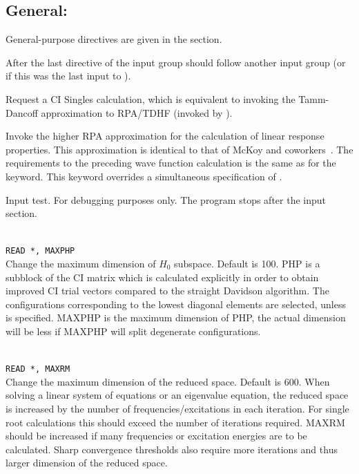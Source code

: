 \subsection{General: }

General-purpose directives are given in the  section.

After the last directive of the  input group
should follow another {} input group
(or  if this was the last input to \dalton).

\begin{description}

\item{}
Request a CI Singles calculation, which is equivalent to invoking the
Tamm-Dancoff approximation to RPA/TDHF (invoked by ).

\item{}
Invoke the higher RPA approximation for the calculation of linear
response properties.
This approximation is identical to that of McKoy
and coworkers~\cite{jrtsvmjcp58,tsjrvmjcp58}. The requirements to the
preceding wave function
calculation is the same as for the  keyword.
This keyword overrides a simultaneous specification of .

\item{}
Input test. For debugging purposes only. The program stops after the
input section.

\item{}\\
\verb|READ *, MAXPHP|\\
Change the maximum dimension of $H_0$ subspace.   Default is 100.
PHP is a subblock of the CI matrix which is calculated explicitly
in order to obtain improved CI trial vectors compared to the
straight Davidson algorithm\cite{erdjcp17}.  The configurations
corresponding to
the lowest diagonal elements are selected, unless  is
specified. MAXPHP is the maximum dimension of PHP, the
actual dimension will be less if MAXPHP will split degenerate configurations.

\item{}\\
\verb|READ *, MAXRM |\\
Change the maximum dimension of the reduced space. Default is 600.
When solving a linear system of equations or an eigenvalue equation,
the reduced space is increased by the number of
frequencies/excitations in each iteration. For single root
calculations this should exceed the number of iterations required.
MAXRM should be increased if many frequencies or excitation energies
are to be calculated.
Sharp convergence thresholds also require
more iterations and thus larger dimension of the reduced space.


\end{description}
